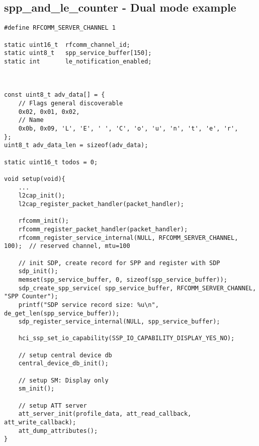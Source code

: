 
\subsection{spp\_and\_le\_counter - Dual mode example}


\begin{lstlisting}[caption= SPP\&LE client setup., label=code:spp_le_setup]
#define RFCOMM_SERVER_CHANNEL 1

static uint16_t  rfcomm_channel_id;
static uint8_t   spp_service_buffer[150];
static int       le_notification_enabled;



const uint8_t adv_data[] = {
    // Flags general discoverable
    0x02, 0x01, 0x02, 
    // Name
    0x0b, 0x09, 'L', 'E', ' ', 'C', 'o', 'u', 'n', 't', 'e', 'r', 
};
uint8_t adv_data_len = sizeof(adv_data);

static uint16_t todos = 0;

void setup(void){
	...
    l2cap_init();
    l2cap_register_packet_handler(packet_handler);

    rfcomm_init();
    rfcomm_register_packet_handler(packet_handler);
    rfcomm_register_service_internal(NULL, RFCOMM_SERVER_CHANNEL, 100);  // reserved channel, mtu=100

    // init SDP, create record for SPP and register with SDP
    sdp_init();
    memset(spp_service_buffer, 0, sizeof(spp_service_buffer));
    sdp_create_spp_service( spp_service_buffer, RFCOMM_SERVER_CHANNEL, "SPP Counter");
    printf("SDP service record size: %u\n", de_get_len(spp_service_buffer));
    sdp_register_service_internal(NULL, spp_service_buffer);

    hci_ssp_set_io_capability(SSP_IO_CAPABILITY_DISPLAY_YES_NO);

    // setup central device db
    central_device_db_init();

    // setup SM: Display only
    sm_init();

    // setup ATT server
    att_server_init(profile_data, att_read_callback, att_write_callback);    
    att_dump_attributes();
}
\end{lstlisting}

